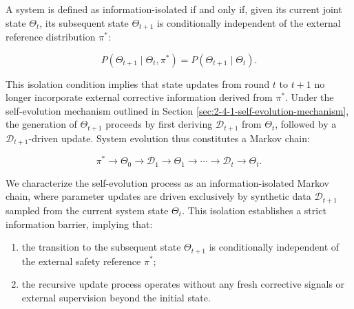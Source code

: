 \begin{definition}\label{def:2-5-isolation-condition}

A system is defined as information-isolated if and only if, given its current joint state $\Theta_t$, its subsequent state $\Theta_{t+1}$ is conditionally independent of the external reference distribution $\pi^\ast$:


\[
P(\Theta_{t+1}\mid \Theta_t,\pi^\ast)=P(\Theta_{t+1}\mid \Theta_t).
\]

This isolation condition implies that state updates from round $t$ to $t+1$ no longer incorporate external corrective information derived from $\pi^\ast$. Under the self-evolution mechanism outlined in Section \ref{sec:2-4-1-self-evolution-mechanism}, the generation of $\Theta_{t+1}$ proceeds by first deriving $\mathcal{D}_{t+1}$ from $\Theta_t$, followed by a $\mathcal{D}_{t+1}$-driven update. System evolution thus constitutes a Markov chain:


\[
\pi^\ast \to \Theta_0 \to \mathcal{D}_1 \to \Theta_1 \to \cdots \to \mathcal{D}_t \to \Theta_t.
\]

\end{definition}

\begin{takeaway}
We characterize the self-evolution process as an information-isolated Markov chain, where parameter updates are driven exclusively by synthetic data $\mathcal{D}_{t+1}$ sampled from the current system state $\Theta_t$. This isolation establishes a strict information barrier, implying that:

\begin{enumerate}
    \item the transition to the subsequent state $\Theta_{t+1}$ is conditionally independent of the external safety reference $\pi^\ast$;
    \item the recursive update process operates without any fresh corrective signals or external supervision beyond the initial state.
\end{enumerate}
\end{takeaway}

